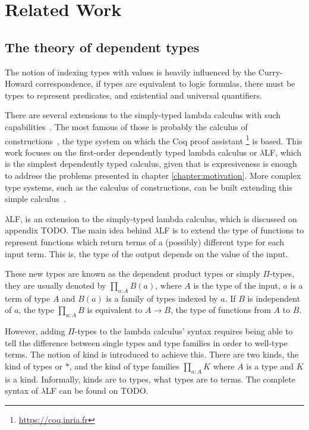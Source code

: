 \chapter{Related Work}

\label{chapter:related_work}

\section{The theory of dependent types} 

The notion of indexing types with values is heavily influenced by the
Curry-Howard correspondence, if types are equivalent to logic formulas, there
must be types to represent predicates, and existential and universal
quantifiers.

There are several extensions to the simply-typed lambda calculus with such
capabilities~\cite{pierce}. The most famous of those is probably the calculus of
constructions~\cite{coc}, the type system on which the Coq proof assistant
\footnote{\url{https://coq.inria.fr}} is based. This work focuses on the first-order
dependently typed lambda calculus or $\lambda$LF, which is the simplest
dependently typed calculus, given that is expresiveness is enough to address the
problems presented in chapter \ref{chapter:motivation}. More complex type
systems, such as the calculus of constructions, can be built extending this
simple calculus~\cite{pierce}.

$\lambda$LF, is an extension to the simply-typed lambda calculus, which is
discussed on appendix TODO. The main idea behind $\lambda$LF is to extend the
type of functions to represent functions which return terms of a (possibly)
different type for each input term. This is, the type of the output
depends on the value of the input.

These new types are known as the dependent product types or simply $\Pi$-types,
they are usually denoted by $\prod_{a:A} B(a)$, where $A$ is the type of the
input, $a$ is a term of type $A$ and $B(a)$ is a family of types indexed by $a$.
If $B$ is independent of $a$, the type $\prod_{a:A} B$ is equivalent to $A
\rightarrow B$, the type of functions from $A$ to $B$.

However, adding $\Pi$-types to the lambda calculus' syntax requires being able
to tell the difference between single types and type families in order to
well-type terms. The notion of kind is introduced to achieve this. There are two
kinds, the kind of types or $*$, and the kind of type families $\prod_{a:A}K$
where $A$ is a type and $K$ is a kind. Informally, kinds are to types, what
types are to terms. The complete syntax of $\lambda$LF can be found on TODO.

